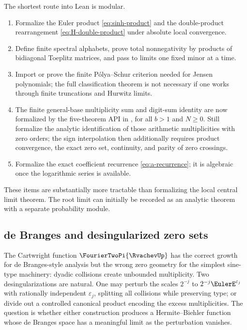 \documentclass[11pt]{article}
\numberwithin{equation}{section}
\theoremstyle{definition}
\theoremstyle{remark}
\begin{document}
The shortest route into Lean is modular.
\begin{enumerate}[leftmargin=2.2em]
\item Formalize the Euler product \eqref{eq:sinh-product} and the double-product rearrangement \eqref{eq:H-double-product} under absolute local convergence.
\item Define finite spectral alphabets, prove total nonnegativity by products of bidiagonal Toeplitz matrices, and pass to limits one fixed minor at a time.
\item Import or prove the finite Pólya--Schur criterion needed for Jensen polynomials; the full classification theorem is not necessary if one works through finite truncations and Hurwitz limits.
\item The finite general-base multiplicity sum and digit-sum identity are now
formalized by the five-theorem API in , for
all \(b>1\) and \(N\ge0\).  Still formalize the analytic identification of
those arithmetic multiplicities with zero orders; the sign interpolation
then additionally requires product convergence, the exact zero set,
continuity, and parity of zero crossings.
\item Formalize the exact coefficient recurrence \eqref{eq:a-recurrence}; it is algebraic once the logarithmic series is available.
\end{enumerate}
These items are substantially more tractable than formalizing the local central limit theorem.  The root limit can initially be recorded as an analytic theorem with a separate probability module.

\subsection{de Branges and desingularized zero sets}

The Cartwright function $\FourierTwoPi{\RvachevUp}$ has the correct growth for de Branges-style analysis but the wrong zero geometry for the simplest sine-type machinery: dyadic collisions create unbounded multiplicity.  Two desingularizations are natural.  One may perturb the scales $2^{-j}$ to $2^{-j}\EulerE^{\varepsilon_j}$ with rationally independent $\varepsilon_j$, splitting all collisions while preserving type; or divide out a controlled canonical product encoding the excess multiplicities.  The question is whether either construction produces a Hermite--Biehler function whose de Branges space has a meaningful limit as the perturbation vanishes.
\end{document}
